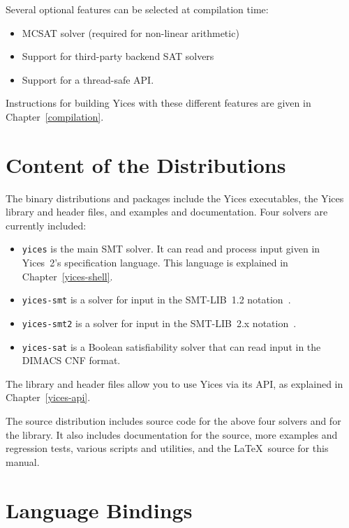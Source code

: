 \documentclass[11pt,twoside,fleqn,openright,titlepage]{cslreport}
\begin{document}
\medskip\noindent
Several optional features can be selected at compilation time:
\begin{itemize}
\item MCSAT solver (required for non-linear arithmetic)
\item Support for third-party backend SAT solvers
\item Support for a thread-safe API.
\end{itemize}
Instructions for building Yices with these different features are given in Chapter~\ref{compilation}.



\section{Content of the Distributions}

The binary distributions and packages include the Yices executables,
the Yices library and header files, and examples and documentation.
Four solvers are currently included:
\begin{itemize}
\item \texttt{yices} is  the main SMT solver. It  can read and process
  input given  in Yices~2's  specification language. This  language is
  explained in Chapter~\ref{yices-shell}.

\item  \texttt{yices-smt} is  a solver  for input  in  the SMT-LIB~1.2
  notation~\cite{SMTLIB12:2006}.

\item \texttt{yices-smt2} is a solver for input in the SMT-LIB~2.x
  notation~\cite{SMTLIB25:2015}.

\item \texttt{yices-sat}  is a Boolean satisfiability  solver that can
  read input in the DIMACS CNF format.
\end{itemize}
The library and header files allow you to use Yices via its API, as
explained in Chapter~\ref{yices-api}.

\medskip\noindent
The source distribution includes source code for the above four
solvers and for the library. It also includes documentation for the
source, more examples and regression tests, various scripts and
utilities, and the \LaTeX\ source for this manual.



\section{Language Bindings}
\label{python-bindings}
\end{document}
